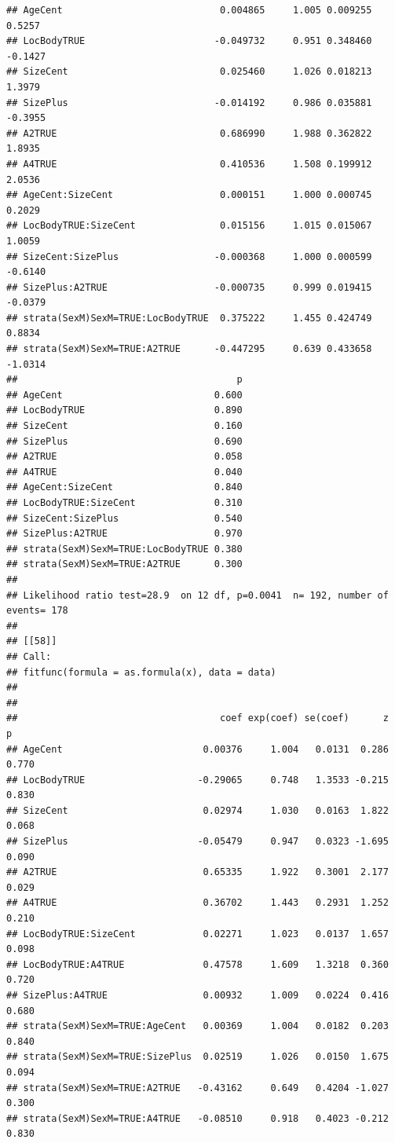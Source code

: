 \documentclass{article}\usepackage[]{graphicx}\usepackage[]{color}
\makeatletter
\newenvironment{kframe}{%
 \def\at@end@of@kframe{}%
 \ifinner\ifhmode%
  \def\at@end@of@kframe{\end{minipage}}%
  \begin{minipage}{\columnwidth}%
 \fi\fi%
 \def\FrameCommand##1{\hskip\@totalleftmargin \hskip-\fboxsep
 \colorbox{shadecolor}{##1}\hskip-\fboxsep
     \hskip-\linewidth \hskip-\@totalleftmargin \hskip\columnwidth}%
 \MakeFramed {\advance\hsize-\width
   \@totalleftmargin\z@ \linewidth\hsize
   \@setminipage}}%
 {\par\unskip\endMakeFramed%
 \at@end@of@kframe}
\newenvironment{knitrout}{}{} %
\makeatother
\begin{document}
\begin{knitrout}
\begin{kframe}
\begin{verbatim}
## AgeCent                            0.004865     1.005 0.009255  0.5257
## LocBodyTRUE                       -0.049732     0.951 0.348460 -0.1427
## SizeCent                           0.025460     1.026 0.018213  1.3979
## SizePlus                          -0.014192     0.986 0.035881 -0.3955
## A2TRUE                             0.686990     1.988 0.362822  1.8935
## A4TRUE                             0.410536     1.508 0.199912  2.0536
## AgeCent:SizeCent                   0.000151     1.000 0.000745  0.2029
## LocBodyTRUE:SizeCent               0.015156     1.015 0.015067  1.0059
## SizeCent:SizePlus                 -0.000368     1.000 0.000599 -0.6140
## SizePlus:A2TRUE                   -0.000735     0.999 0.019415 -0.0379
## strata(SexM)SexM=TRUE:LocBodyTRUE  0.375222     1.455 0.424749  0.8834
## strata(SexM)SexM=TRUE:A2TRUE      -0.447295     0.639 0.433658 -1.0314
##                                       p
## AgeCent                           0.600
## LocBodyTRUE                       0.890
## SizeCent                          0.160
## SizePlus                          0.690
## A2TRUE                            0.058
## A4TRUE                            0.040
## AgeCent:SizeCent                  0.840
## LocBodyTRUE:SizeCent              0.310
## SizeCent:SizePlus                 0.540
## SizePlus:A2TRUE                   0.970
## strata(SexM)SexM=TRUE:LocBodyTRUE 0.380
## strata(SexM)SexM=TRUE:A2TRUE      0.300
## 
## Likelihood ratio test=28.9  on 12 df, p=0.0041  n= 192, number of events= 178 
## 
## [[58]]
## Call:
## fitfunc(formula = as.formula(x), data = data)
## 
## 
##                                    coef exp(coef) se(coef)      z     p
## AgeCent                         0.00376     1.004   0.0131  0.286 0.770
## LocBodyTRUE                    -0.29065     0.748   1.3533 -0.215 0.830
## SizeCent                        0.02974     1.030   0.0163  1.822 0.068
## SizePlus                       -0.05479     0.947   0.0323 -1.695 0.090
## A2TRUE                          0.65335     1.922   0.3001  2.177 0.029
## A4TRUE                          0.36702     1.443   0.2931  1.252 0.210
## LocBodyTRUE:SizeCent            0.02271     1.023   0.0137  1.657 0.098
## LocBodyTRUE:A4TRUE              0.47578     1.609   1.3218  0.360 0.720
## SizePlus:A4TRUE                 0.00932     1.009   0.0224  0.416 0.680
## strata(SexM)SexM=TRUE:AgeCent   0.00369     1.004   0.0182  0.203 0.840
## strata(SexM)SexM=TRUE:SizePlus  0.02519     1.026   0.0150  1.675 0.094
## strata(SexM)SexM=TRUE:A2TRUE   -0.43162     0.649   0.4204 -1.027 0.300
## strata(SexM)SexM=TRUE:A4TRUE   -0.08510     0.918   0.4023 -0.212 0.830

\end{verbatim}
\end{kframe}
\end{knitrout}
\end{document}
